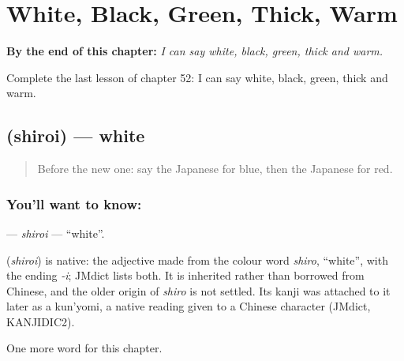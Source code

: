 
\chapter{White, Black, Green, Thick, Warm}
\label{ch:ja-white-black-green-thick-warm}

\begin{chapteropening}
\textbf{By the end of this chapter:} \emph{I can say white, black, green, thick and warm.}

Complete the last lesson of chapter 52: I can say white, black, green, thick and warm.
\end{chapteropening}

\section[\texorpdfstring{\ja{しろい} (shiroi)}{しろい (shiroi)}]{ (shiroi) — white}

\label{lesson:JA-C52-shiroi}



\begin{quote}
Before the new one: say the Japanese for blue, then the Japanese for red.
\end{quote}

\subsection*{You'll want to know: }
\textbf{} — \emph{shiroi} — \textquotedblleft{}white\textquotedblright{}.

\begin{cousinweb}
\textbf{} (\emph{shiroi}) is native: the adjective made from the colour word \emph{shiro}, \textquotedblleft{}white\textquotedblright{}, with the ending \emph{-i}; JMdict lists both. It is inherited rather than borrowed from Chinese, and the older origin of \emph{shiro} is not settled. Its kanji was attached to it later as a kun'yomi, a native reading given to a Chinese character (JMdict, KANJIDIC2).
\end{cousinweb}

\begin{grammarlens}[title={What you've built}]
One more word for this chapter.
\end{grammarlens}

